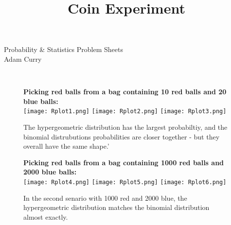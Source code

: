 \documentclass{article}
\title{Coin Experiment}
\begin{document}
Probability \& Statistics Problem Sheets\\
Adam Curry
\vspace{3 mm}
\hline

\hspace{25 mm}

\large{}\\


\begin{figure}[h]
\centering
\textbf{Picking red balls from a bag containing 10 red balls and 20 blue balls:}\\
\texttt{[image: Rplot1.png]}
\texttt{[image: Rplot2.png]}
\texttt{[image: Rplot3.png]}

The hypergeometric distribution has the largest probabiltiy, and the binomial distrubutions probabilities are closer together - but they overall have the same shape.'
\centering
\end{figure}

\begin{figure}[h]
\centering
\textbf{Picking red balls from a bag containing 1000 red balls and 2000 blue balls:}\\
\texttt{[image: Rplot4.png]}
\texttt{[image: Rplot5.png]}
\texttt{[image: Rplot6.png]}

In the second senario with 1000 red and 2000 blue, the hypergeometric distribution matches the binomial distribution almost exactly.
\centering
\end{figure}
\end{document}
